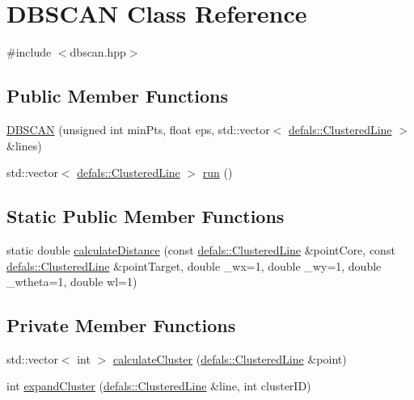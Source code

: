 \hypertarget{class_d_b_s_c_a_n}{}\section{D\+B\+S\+C\+AN Class Reference}
\label{class_d_b_s_c_a_n}


{\ttfamily \#include $<$dbscan.\+hpp$>$}

\subsection*{Public Member Functions}
\begin{DoxyCompactItemize}
\item 
\hyperlink{class_d_b_s_c_a_n_a3cfe5615c80c46d3e309dba2ab506dd7}{D\+B\+S\+C\+AN} (unsigned int min\+Pts, float eps, std\+::vector$<$ \hyperlink{classdefals_1_1_clustered_line}{defals\+::\+Clustered\+Line} $>$ \&lines)
\item 
std\+::vector$<$ \hyperlink{classdefals_1_1_clustered_line}{defals\+::\+Clustered\+Line} $>$ \hyperlink{class_d_b_s_c_a_n_a0085bd9fa516dc3c1a62da8fcb3ba6de}{run} ()
\end{DoxyCompactItemize}
\subsection*{Static Public Member Functions}
\begin{DoxyCompactItemize}
\item 
static double \hyperlink{class_d_b_s_c_a_n_a29153d6147fccd431c58f17840ee7bc0}{calculate\+Distance} (const \hyperlink{classdefals_1_1_clustered_line}{defals\+::\+Clustered\+Line} \&point\+Core, const \hyperlink{classdefals_1_1_clustered_line}{defals\+::\+Clustered\+Line} \&point\+Target, double _wx=1, double _wy=1, double _wtheta=1, double wl=1)
\end{DoxyCompactItemize}
\subsection*{Private Member Functions}
\begin{DoxyCompactItemize}
\item 
std\+::vector$<$ int $>$ \hyperlink{class_d_b_s_c_a_n_acdcfeb8f4e47927b83ade8256d677c10}{calculate\+Cluster} (\hyperlink{classdefals_1_1_clustered_line}{defals\+::\+Clustered\+Line} \&point)
\item 
int \hyperlink{class_d_b_s_c_a_n_ace87c3c6b0e4b5bb50ccd0156e2319b7}{expand\+Cluster} (\hyperlink{classdefals_1_1_clustered_line}{defals\+::\+Clustered\+Line} \&line, int cluster\+ID)
\end{DoxyCompactItemize}
